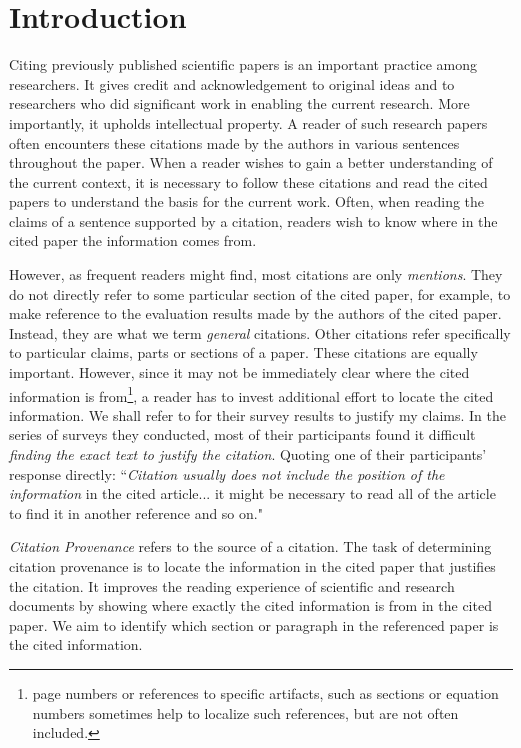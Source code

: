 \chapter{Introduction}
\label{introduction}
Citing previously published scientific papers is an important practice among researchers. It gives credit and acknowledgement to original ideas and to researchers who did significant work in enabling the current research.  More importantly, it upholds intellectual property. A reader of such research papers often encounters these citations made by the authors in various sentences throughout the paper. When a reader wishes to gain a better understanding of the current context, it is necessary to follow these citations and read the cited papers to understand the basis for the current work.  Often, when reading the claims of a sentence supported by a citation, readers wish to know where in the cited paper the information comes from.  

However, as frequent readers might find, most citations are only \textit{mentions}. They do not directly refer to some particular section of the cited paper, for example, to make reference to the evaluation results made by the authors of the cited paper. Instead, they are what we term {\it general} citations. Other citations refer specifically to particular claims, parts or sections of a paper.  These citations are equally important.  However, since it may not be immediately clear where the cited information is from\footnote{page numbers or references to specific artifacts, such as sections or equation numbers sometimes help to localize such references, but are not often included.}, a reader has to invest additional effort to locate the cited information. We shall refer to \cite{citation-sensitive} for their survey results to justify my claims. In the series of surveys they conducted, most of their participants found it difficult \textit{finding the exact text to justify the citation}. Quoting one of their participants' response directly: ``\textit{Citation usually does not include the position of the information} in the cited article... it might be necessary to read all of the article to find it in another reference and so on." \cite{citation-sensitive}

{\it Citation Provenance} refers to the source of a citation. The task of determining citation provenance is to locate the information in the cited paper that justifies the citation. It improves the reading experience of scientific and research documents by showing where exactly the cited information is from in the cited paper. We aim to identify which section or paragraph in the referenced paper is the cited information. 

